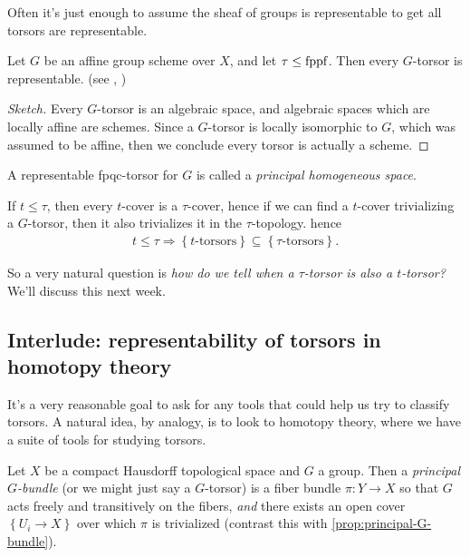 \documentclass[11pt,openany]{book}
\begin{document}
Often it's just enough to assume the sheaf of groups is representable to get all torsors are representable.

\begin{proposition}\label{prop:affine-gp-torsors-representable} 
Let $G$ be an affine group scheme over $X$, and let $\tau\le \mathrm{fppf}$. Then every $G$-torsor is representable. (see \cite[0497]{Stacks}, \cite[3.25]{Youcis})
\end{proposition}
\begin{proof}[Sketch] Every $G$-torsor is an algebraic space, and algebraic spaces which are locally affine are schemes. Since a $G$-torsor is locally isomorphic to $G$, which was assumed to be affine, then we conclude every torsor is actually a scheme.
\end{proof}


\begin{terminology} A representable fpqc-torsor for $G$ is called a \textit{principal homogeneous space}.
\end{terminology}


\begin{remark} If $t \le \tau$, then every $t$-cover is a $\tau$-cover, hence if we can find a $t$-cover trivializing a $G$-torsor, then it also trivializes it in the $\tau$-topology. hence
\begin{align*}
    t\le \tau \Rightarrow \left\{ t\text{-torsors} \right\} \subseteq \left\{ \tau \text{-torsors} \right\}.
\end{align*}
\end{remark}
So a very natural question is \textit{how do we tell when a $\tau$-torsor is also a $t$-torsor?} We'll discuss this next week.


\subsection{Interlude: representability of torsors in homotopy theory}

It's a very reasonable goal to ask for any tools that could help us try to classify torsors. A natural idea, by analogy, is to look to homotopy theory, where we have a suite of tools for studying torsors.

\begin{definition} Let $X$ be a compact Hausdorff topological space and $G$ a group. Then a \textit{principal $G$-bundle} (or we might just say a $G$-torsor) is a fiber bundle $\pi \colon Y \to X$ so that $G$ acts freely and transitively on the fibers, \textit{and} there exists an open cover $\left\{ U_i \to X \right\}$ over which $\pi$ is trivialized (contrast this with \autoref{prop:principal-G-bundle}).
\end{definition}
\end{document}
